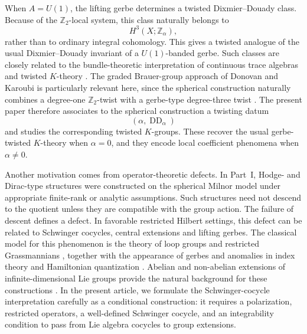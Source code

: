 \documentclass[11pt]{amsart}
\begin{document}
When \(A=U(1)\), the lifting gerbe determines a twisted
Dixmier--Douady class. Because of the \(\mathbb Z_2\)-local system, this class
naturally belongs to
\[
H^3(X;\mathbb Z_\alpha),
\]
rather than to ordinary integral cohomology. This gives a twisted analogue of
the usual Dixmier--Douady invariant of a \(U(1)\)-banded gerbe. Such classes
are closely related to the bundle-theoretic interpretation of continuous trace
algebras and twisted \(K\)-theory \cite{Rosenberg1989,AtiyahSegal2004}.
The graded Brauer-group approach of Donovan and Karoubi is particularly
relevant here, since the spherical construction naturally combines a degree-one
\(\mathbb Z_2\)-twist with a gerbe-type degree-three twist
\cite{DonovanKaroubi1970}. The present paper therefore associates to the
spherical construction a twisting datum
\[
(\alpha,\operatorname{DD}_\alpha)
\]
and studies the corresponding twisted \(K\)-groups. These recover the usual
gerbe-twisted \(K\)-theory when \(\alpha=0\), and they encode local
coefficient phenomena when \(\alpha\neq0\).

Another motivation comes from operator-theoretic defects. In Part~I, Hodge-
and Dirac-type structures were constructed on the spherical Milnor model under
appropriate finite-rank or analytic assumptions. Such structures need not
descend to the quotient unless they are compatible with the group action. The
failure of descent defines a defect. In favorable restricted Hilbert settings,
this defect can be related to Schwinger cocycles, central extensions and
lifting gerbes. The classical model for this phenomenon is the theory of loop
groups and restricted Grassmannians \cite{PressleySegal1986}, together with
the appearance of gerbes and anomalies in index theory and Hamiltonian
quantization \cite{CareyMickelssonMurray1997,Freed1995}. Abelian and
non-abelian extensions of infinite-dimensional Lie groups provide the natural
background for these constructions \cite{Neeb2004,Neeb2007}. In the present
article, we formulate the Schwinger-cocycle interpretation carefully as a
conditional construction: it requires a polarization, restricted operators, a
well-defined Schwinger cocycle, and an integrability condition to pass from
Lie algebra cocycles to group extensions.
\end{document}
